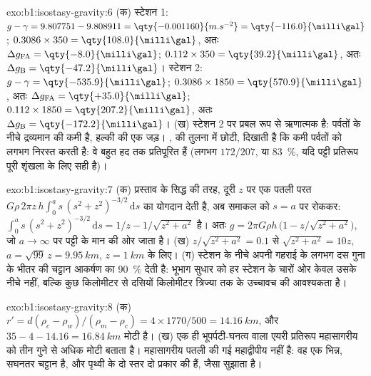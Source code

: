 \begin{solution}{exo:b1:isostasy-gravity:6}
(क) स्टेशन 1: $g - \gamma = 9.807751 - 9.808911 = \qty{-0.001160}{m.s^{-2}} =
\qty{-116.0}{\milli\gal}$;  $0.3086\times350 =
\qty{108.0}{\milli\gal}$, अतः $\Delta g_{\mathrm{FA}} = \qty{-8.0}{\milli\gal}$;
 $0.112\times350 = \qty{39.2}{\milli\gal}$, अतः
$\Delta g_{\mathrm B} = \qty{-47.2}{\milli\gal}$।
स्टेशन 2: $g - \gamma = \qty{-535.9}{\milli\gal}$; 
$0.3086\times1850 = \qty{570.9}{\milli\gal}$, अतः $\Delta g_{\mathrm{FA}} =
\qty{+35.0}{\milli\gal}$;  $0.112\times1850 =
\qty{207.2}{\milli\gal}$, अतः $\Delta g_{\mathrm B} = \qty{-172.2}{\milli\gal}$।
(ख) स्टेशन 2 पर  प्रबल रूप से ऋणात्मक है: पर्वतों के नीचे द्रव्यमान की कमी है, हल्की  की एक जड़। ,  की तुलना में छोटी, दिखाती है कि कमी पर्वतों को लगभग निरस्त करती है: वे बहुत हद तक प्रतिपूरित हैं (लगभग $172/207$, या \qty{83}{\percent}, यदि पट्टी प्रतिरूप पूरी शृंखला के लिए सही है)।
\end{solution}

\begin{solution}{exo:b1:isostasy-gravity:7}
(क) प्रस्ताव के सिद्ध की तरह, दूरी $z$ पर एक पतली परत
$G\rho\,2\pi z\,h\int_0^a s\,(s^2 + z^2)^{-3/2}\,\mathrm ds$ का योगदान देती है, अब समाकल को $s = a$ पर रोककर:
$\int_0^a s\,(s^2 + z^2)^{-3/2}\,\mathrm ds = 1/z - 1/\sqrt{z^2 + a^2}$ है। अतः
$g = 2\pi G\rho h\,\bigl(1 - z/\sqrt{z^2 + a^2}\bigr)$, जो $a \to \infty$ पर पट्टी के मान की ओर जाता है। (ख) $z/\sqrt{z^2 + a^2} = 0.1$ से
$\sqrt{z^2 + a^2} = 10z$, $a = \sqrt{99}\,z = \qty{9.95}{km}$, $z = \qty{1}{km}$ के लिए। (ग) स्टेशन के नीचे अपनी गहराई के लगभग दस गुना के भीतर की चट्टान आकर्षण का \qty{90}{\percent} देती है: भूभाग सुधार को हर स्टेशन के चारों ओर केवल उसके नीचे नहीं, बल्कि कुछ किलोमीटर से दसियों किलोमीटर त्रिज्या तक के उच्चावच की आवश्यकता है।
\end{solution}

\begin{solution}{exo:b1:isostasy-gravity:8}
(क) $r' = d(\rho_c - \rho_w)/(\rho_m - \rho_c) = 4\times1770/500 =
\qty{14.16}{km}$, और  $35 - 4 - 14.16 = \qty{16.84}{km}$ मोटी है।
(ख) एक ही भूपर्पटी-घनत्व वाला एयरी प्रतिरूप महासागरीय  को तीन गुने से अधिक मोटी बताता है। महासागरीय  पतली की गई महाद्वीपीय  नहीं है: वह एक भिन्न, सघनतर चट्टान है, और पृथ्वी के दो स्तर दो प्रकार की  हैं, जैसा  सुझाता है।
\end{solution}

